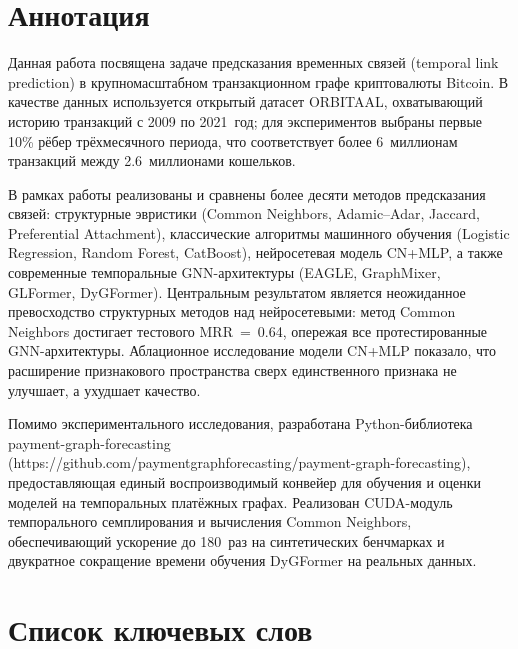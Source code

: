 \documentclass[a4paper,12pt]{extarticle}
\begin{document}
\newpage
\setcounter{page}{2}

{
	\hypersetup{linkcolor=black}
	\tableofcontents
}
\newpage

\section*{Аннотация}


Данная работа посвящена задаче предсказания временных связей (temporal link prediction) в крупномасштабном транзакционном графе криптовалюты Bitcoin. В качестве данных используется открытый датасет ORBITAAL, охватывающий историю транзакций с 2009 по 2021~год; для экспериментов выбраны первые 10\% рёбер трёхмесячного периода, что соответствует более 6~миллионам транзакций между 2.6~миллионами кошельков.

В рамках работы реализованы и сравнены более десяти методов предсказания связей: структурные эвристики (Common Neighbors, Adamic--Adar, Jaccard, Preferential Attachment), классические алгоритмы машинного обучения (Logistic Regression, Random Forest, CatBoost), нейросетевая модель CN+MLP, а также современные темпоральные GNN-архитектуры (EAGLE, GraphMixer, GLFormer, DyGFormer). Центральным результатом является неожиданное превосходство структурных методов над нейросетевыми: метод Common Neighbors достигает тестового MRR~=~0.64, опережая все протестированные GNN-архитектуры. Аблационное исследование модели CN+MLP показало, что расширение признакового пространства сверх единственного признака не улучшает, а ухудшает качество.

Помимо экспериментального исследования, разработана Python-библиотека payment-graph-forecasting (https://github.com/paymentgraphforecasting/payment-graph-forecasting), предоставляющая единый воспроизводимый конвейер для обучения и оценки моделей на темпоральных платёжных графах. Реализован CUDA-модуль темпорального семплирования и вычисления Common Neighbors, обеспечивающий ускорение до 180~раз на синтетических бенчмарках и двукратное сокращение времени обучения DyGFormer на реальных данных.

\section*{Список ключевых слов}
\end{document}
